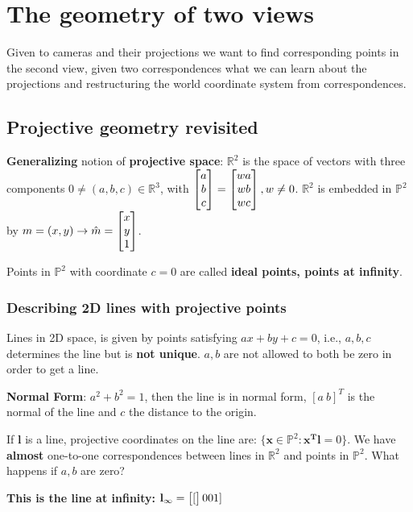 \chapter{The geometry of two views}

Given to cameras and their projections we want to find corresponding points in the second view, given two correspondences what we can learn about the projections and restructuring the world coordinate system from correspondences.

\section{Projective geometry revisited}

\textbf{Generalizing} notion of \textbf{projective space}: $\mathbb{R}^2$ is the space of vectors with three components $0 \neq (a,b,c) \in \mathbb{R}^3$, with $\left[\begin{matrix}a \\ b \\ c\end{matrix}\right] = \left[\begin{matrix}wa \\ wb \\ wc\end{matrix}\right], w \neq 0$. $\mathbb{R}^2$ is embedded in $\mathbb{P}^2$ by $m = (x,y) \rightarrow \hat{m} = \left[\begin{matrix}x \\ y \\ 1\end{matrix}\right]$.

Points in $\mathbb{P}^2$ with coordinate $c = 0$ are called \textbf{ideal points, points at infinity}.

\subsection{Describing 2D lines with projective points}

Lines in 2D space, is given by points satisfying $ax + by + c = 0$, i.e., $a,b,c$ determines the line but is \textbf{not unique}. $a,b$ are not allowed to both be zero in order to get a line.

\textbf{Normal Form}: $a^2 + b^2 = 1$, then the line is in normal form, $[a \ b]^T$ is the normal of the line and $c$ the distance to the origin.

If $\mathbf{l}$ is a line, projective coordinates on the line are: $\{\mathbf{x} \in \mathbb{P}^2 : \mathbf{x^T l} = 0\}$. We have \textbf{almost} one-to-one correspondences between lines in $\mathbb{R}^2$ and points in $\mathbb{P}^2$. What happens if $a,b$ are zero?

\textbf{This is the line at infinity:} $\mathbf{l}_\infty = \left[\begin{matrix}[\end{matrix}\right]0 \\ 0 \\ 1]$

